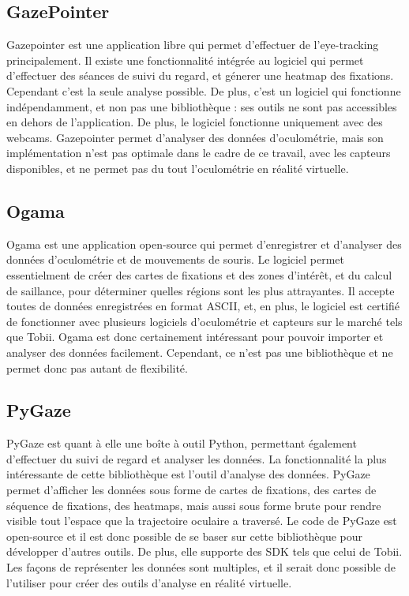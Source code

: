 \documentclass[12pt]{article}
\begin{document}
\subsection{GazePointer}

Gazepointer \cite{gazepointer} est une application libre qui permet d'effectuer
de l'eye-tracking principalement. Il existe une fonctionnalité intégrée au
logiciel qui permet d'effectuer des séances de suivi du regard, et génerer une
heatmap des fixations. Cependant c'est la seule analyse possible. De plus,
c'est un logiciel qui fonctionne indépendamment, et non pas une bibliothèque :
ses outils ne sont pas accessibles en dehors de l'application. De plus, le
logiciel fonctionne uniquement avec des webcams. Gazepointer permet d'analyser
des données d'oculométrie, mais son implémentation n'est pas optimale dans le
cadre de ce travail, avec les capteurs disponibles, et ne permet pas du tout
l'oculométrie en réalité virtuelle.

\subsection{Ogama}

Ogama \cite{ogama} est une application open-source qui permet d'enregistrer et
d'analyser des données d'oculométrie et de mouvements de souris. Le logiciel
permet essentielment de créer des cartes de fixations et des zones d'intérêt,
et du calcul de saillance, pour déterminer quelles régions sont les plus
attrayantes. Il accepte toutes de données enregistrées en format ASCII, et, en
plus, le logiciel est certifié de fonctionner avec plusieurs logiciels
d'oculométrie et capteurs sur le marché tels que Tobii. Ogama est donc
certainement intéressant pour pouvoir importer et analyser des données
facilement. Cependant, ce n'est pas une bibliothèque et ne permet donc pas
autant de flexibilité.

\subsection{PyGaze}

PyGaze \cite{pygaze} est quant à elle une boîte à outil Python, permettant
également d'effectuer du suivi de regard et analyser les données. La
fonctionnalité la plus intéressante de cette bibliothèque est l'outil
d'analyse des données. PyGaze permet d'afficher les données sous forme de
cartes de fixations, des cartes de séquence de fixations, des heatmaps,
mais aussi sous forme brute pour rendre visible tout l'espace que la
trajectoire oculaire a traversé. Le code de PyGaze est open-source et il est
donc possible de se baser sur cette bibliothèque pour développer d'autres
outils. De plus, elle supporte des SDK tels que celui de Tobii. Les façons de
représenter les données sont multiples, et il serait donc possible de
l'utiliser pour créer des outils d'analyse en réalité virtuelle.
\end{document}
